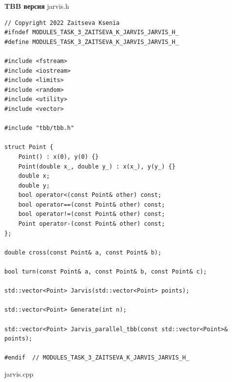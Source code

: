 \documentclass{report}
\begin{document}
\textbf{TBB версия}
\newline
\newline jarvis.h
\begin{lstlisting}
// Copyright 2022 Zaitseva Ksenia
#ifndef MODULES_TASK_3_ZAITSEVA_K_JARVIS_JARVIS_H_
#define MODULES_TASK_3_ZAITSEVA_K_JARVIS_JARVIS_H_

#include <fstream>
#include <iostream>
#include <limits>
#include <random>
#include <utility>
#include <vector>

#include "tbb/tbb.h"

struct Point {
	Point() : x(0), y(0) {}
	Point(double x_, double y_) : x(x_), y(y_) {}
	double x;
	double y;
	bool operator<(const Point& other) const;
	bool operator==(const Point& other) const;
	bool operator!=(const Point& other) const;
	Point operator-(const Point& other) const;
};

double cross(const Point& a, const Point& b);

bool turn(const Point& a, const Point& b, const Point& c);

std::vector<Point> Jarvis(std::vector<Point> points);

std::vector<Point> Generate(int n);

std::vector<Point> Jarvis_parallel_tbb(const std::vector<Point>& points);

#endif  // MODULES_TASK_3_ZAITSEVA_K_JARVIS_JARVIS_H_

\end{lstlisting}
jarvis.cpp
\end{document}
